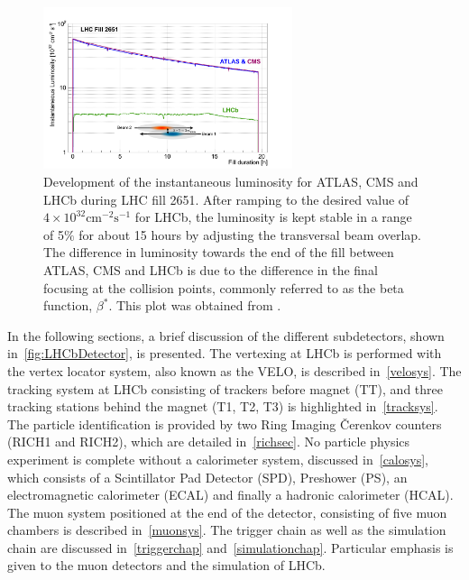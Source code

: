 \begin{figure}
	\centering
        \includegraphics[width = 0.65\textwidth]{figs/detector/lumicompare.png}%
	\caption{Development of the instantaneous luminosity for \Gls{ATLAS}, \Gls{CMS} and \Gls{LHCb} during LHC fill 2651. After ramping to the desired value of $4\times10^{32}\mathrm{cm^{-2}s^{-1}}$
	for \Gls{LHCb}, the luminosity is kept stable in a range of 5$\%$ for about 15 hours by adjusting the transversal beam overlap. The difference in luminosity towards the end of the fill between \Gls{ATLAS}, \Gls{CMS} and \Gls{LHCb} is due to the difference in the final focusing at the collision points, commonly referred to as the beta function, $\beta^{*}$. This plot was obtained from \cite{LHCb-DP-2014-002}.}
	\label{fig:lhcbintlumi}
\end{figure}

In the following sections, a brief discussion of the different subdetectors, shown in~\autoref{fig:LHCbDetector}, is presented. The vertexing at \gls{LHCb} is performed with the vertex locator system, also known as the VELO, is described in~\autoref{velosys}. The tracking system at \gls{LHCb} consisting of trackers before magnet (TT), and three tracking stations behind the magnet (T1, T2, T3) is highlighted in~\autoref{tracksys}. The particle identification is provided by two Ring Imaging \v{C}erenkov counters (RICH1 and RICH2), which are detailed in~\autoref{richsec}. No particle physics experiment is complete without a calorimeter system, discussed in~\autoref{calosys}, which consists of a Scintillator Pad Detector (SPD), Preshower (PS), an electromagnetic calorimeter (ECAL) and finally a hadronic calorimeter (HCAL). The muon system positioned at the end of the detector, consisting of five muon chambers is described in~\autoref{muonsys}. The trigger chain as well as the simulation chain are discussed in~\autoref{triggerchap} and~\autoref{simulationchap}. Particular emphasis is given to the muon detectors and the simulation of \gls{LHCb}.

